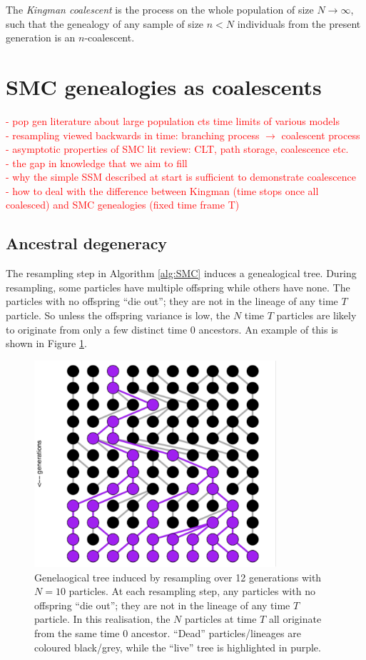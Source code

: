 \documentclass[fleqn]{article}
\begin{document}
The \emph{Kingman coalescent} is the process on the whole population of size $N\to\infty$, such that the genealogy of any sample of size $n<N$ individuals from the present generation is an $n$-coalescent.


\section{SMC genealogies as coalescents}
\textcolor{red}{
- pop gen literature about large population cts time limits of various models\\
- resampling viewed backwards in time: branching process $\to$ coalescent process\\
- asymptotic properties of SMC lit review: CLT, path storage, coalescence etc.\\
- the gap in knowledge that we aim to fill\\
- why the simple SSM described at start is sufficient to demonstrate coalescence\\
- how to deal with the difference between Kingman (time stops once all coalesced) and SMC genealogies (fixed time frame T)
}

\subsection{Ancestral degeneracy}
The resampling step in Algorithm \ref{alg:SMC} induces a genealogical tree.
During resampling, some particles have multiple offspring while others have none. The particles with no offspring ``die out''; they are not in the lineage of any time $T$ particle. So unless the offspring variance is low, the $N$ time $T$ particles are likely to originate from only a few distinct time $0$ ancestors.
An example of this is shown in Figure \ref{fig:WF_tree}.

\begin{figure}
\centering
\includegraphics[width=0.8\textwidth]{eg_WF.pdf}
\caption{Genelaogical tree induced by resampling over 12 generations with $N=10$ particles. At each resampling step, any particles with no offspring ``die out''; they are not in the lineage of any time $T$ particle. In this realisation, the $N$ particles at time $T$ all originate from the same time $0$ ancestor. ``Dead'' particles/lineages are coloured black/grey, while the ``live'' tree is highlighted in purple.}
\label{fig:WF_tree}
\end{figure}
\end{document}
